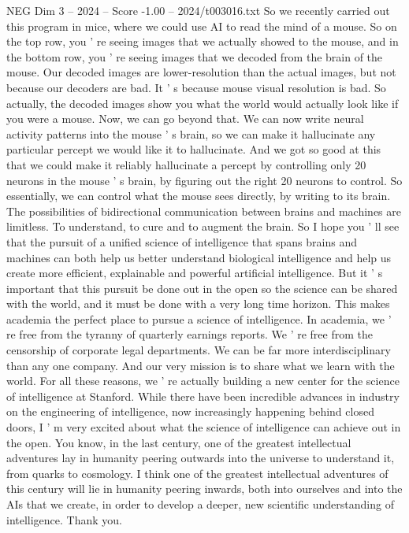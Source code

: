 \begin{textsample}{NEG Dim 3 – 2024 – Score -1.00 – 2024/t003016.txt}
So we recently carried out this program in mice, where we could use AI to read the mind of a mouse.
So on the top row, you ' re seeing images that we actually showed to the mouse, and in the bottom row, you ' re seeing images that we decoded from the brain of the mouse.
Our decoded images are lower-resolution than the actual images, but not because our decoders are bad.
It ' s because mouse visual resolution is bad.
So actually, the decoded images show you what the world would actually look like if you were a mouse.
Now, we can go beyond that.
We can now write neural activity patterns into the mouse ' s brain, so we can make it hallucinate any particular percept we would like it to hallucinate.
And we got so good at this that we could make it reliably hallucinate a percept by controlling only 20 neurons in the mouse ' s brain, by figuring out the right 20 neurons to control.
So essentially, we can control what the mouse sees directly, by writing to its brain.
The possibilities of bidirectional communication between brains and machines are limitless.
To understand, to cure and to augment the brain.
So I hope you ' ll see that the pursuit of a unified science of intelligence that spans brains and machines can both help us better understand biological intelligence and help us create more efficient, explainable and powerful artificial intelligence.
But it ' s important that this pursuit be done out in the open so the science can be shared with the world, and it must be done with a very long time horizon.
This makes academia the perfect place to pursue a science of intelligence.
In academia, we ' re free from the tyranny of quarterly earnings reports.
We ' re free from the censorship of corporate legal departments.
We can be far more interdisciplinary than any one company.
And our very mission is to share what we learn with the world.
For all these reasons, we ' re actually building a new center for the science of intelligence at Stanford.
While there have been incredible advances in industry on the engineering of intelligence, now increasingly happening behind closed doors, I ' m very excited about what the science of intelligence can achieve out in the open.
You know, in the last century, one of the greatest intellectual adventures lay in humanity peering outwards into the universe to understand it, from quarks to cosmology.
I think one of the greatest intellectual adventures of this century will lie in humanity peering inwards, both into ourselves and into the AIs that we create, in order to develop a deeper, new scientific understanding of intelligence.
Thank you.

\end{textsample}
